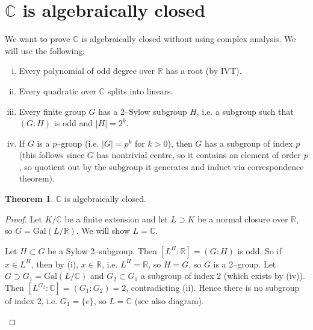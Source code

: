 \documentclass{article}
\theoremstyle{definition}
\newtheorem{theorem}{Theorem}[section]
\begin{document}
\section{$\mathbb{C}$ is algebraically closed}
We want to prove $\mathbb{C}$ is algebraically closed without using complex analysis. We will use the following:
\begin{enumerate}[(i)]
    \item Every polynomial of odd degree over $\mathbb{R}$ has a root (by IVT).
    \item Every quadratic over $\mathbb{C}$ splits into linears.
    \item Every finite group $G$ has a 2--Sylow subgroup $H$, i.e. a subgroup such that $(G:H)$ is odd and $|H|=2^k$.
    \item If $G$ is a $p$--group (i.e. $|G|=p^k$ for $k>0$), then $G$ has a subgroup of index $p$ (this follows since $G$ has nontrivial centre, so it contains an element of order $p$, so quotient out by the subgroup it generates and induct via correspondence theorem).
\end{enumerate}
\begin{theorem}
    $\mathbb{C}$ is algebraically closed.
\end{theorem}
\begin{proof}
    Let $K/\mathbb{C}$ be a finite extension and let $L \supset K$ be a normal closure over $\mathbb{R}$, so $G=\text{Gal}(L/\mathbb{R})$. We will show $L=\mathbb{C}$.
    \vspace{1mm}
    
    Let $H \subset G$ be a Sylow 2--subgroup. Then $[L^H : \mathbb{R}] = (G:H)$ is odd. So if $x \in L^H$, then by (i), $x \in \mathbb{R}$, i.e. $L^H=\mathbb{R}$, so $H=G$, so $G$ is a 2--group. Let $G \supset G_1 = \text{Gal}(L/\mathbb{C})$ and $G_2 \subset G_1$ a subgroup of index 2 (which exists by (iv)). Then $[L^{G_2}:\mathbb{C}]=(G_1 : G_2) = 2$, contradicting (ii). Hence there is no subgroup of index 2, i.e. $G_1=\{e\}$, so $L=\mathbb{C}$ (see also diagram).
    \begin{figure}[H]
        \centering
    \end{figure}
\end{proof}
\end{document}

